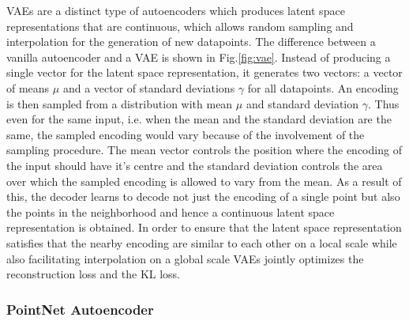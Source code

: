 \vspace{5mm}

\ac{VAE}s are a distinct type of autoencoders which produces latent space representations that are continuous, which allows random sampling and interpolation for the generation of new datapoints. The difference between a vanilla autoencoder and a \ac*{VAE} is shown in Fig.\ref*{fig:vae}. Instead of producing a single vector for the latent space representation, it generates two vectors: a vector of means $\mu$ and a vector of standard deviations $\gamma$ for all datapoints. An encoding is then sampled from a distribution with mean $\mu$ and standard deviation $\gamma$. Thus even for the same input, i.e. when the mean and the standard deviation are the same, the sampled encoding would vary because of the involvement of the sampling procedure. The mean vector controls the position where the encoding of the input should have it's centre and the standard deviation controls the area over which the sampled encoding is allowed to vary from the mean. As a result of this, the decoder learns to decode not just the encoding of a single point but also the points in the neighborhood and hence a continuous latent space representation is obtained. In order to ensure that the latent space representation satisfies that the nearby encoding are similar to each other on a local scale while also facilitating interpolation on a global scale \ac{VAE}s jointly optimizes the reconstruction loss and the \ac*{KL}\cite*{kullback1951information} loss.\cite*{kingma2019introduction,vae}

\subsubsection{PointNet Autoencoder}
